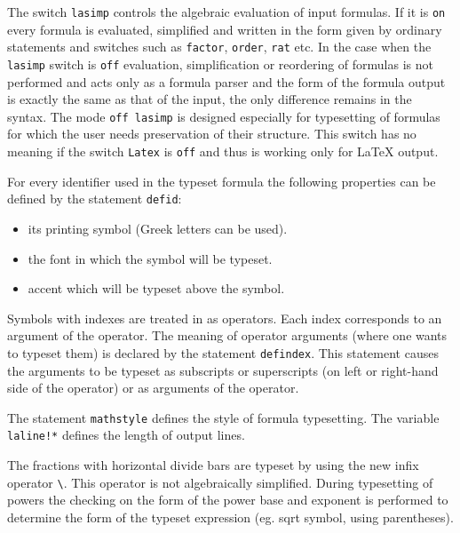 The switch {\tt lasimp} controls the algebraic evaluation of input
formulas.  If it is {\tt on} every formula is evaluated, simplified and
written in the form given by ordinary \REDUCE{} statements and switches
such as {\tt factor}, {\tt order}, {\tt rat} etc.  In the case when the
{\tt lasimp} switch is {\tt off} evaluation, simplification or
reordering of formulas is not performed and \REDUCE{} acts only as a
formula parser and the form of the formula output is exactly the same as
that of the input, the only difference remains in the syntax.  The mode
{\tt off lasimp} is designed especially for typesetting of formulas for
which the user needs preservation of their structure.  This switch has
no meaning if the switch {\tt Latex} is {\tt off} and thus is working
only for \LaTeX{} output.

For every  identifier  used  in  the  typeset  \REDUCE{}  formula
the following properties can be defined by the statement {\tt defid}:
\begin{itemize}
\item its printing symbol (Greek letters can be used).
\item the font in which the symbol will be typeset.
\item accent which will be typeset above the symbol.
\end{itemize}

Symbols with indexes are treated in \REDUCE{} as operators.  Each index
corresponds to an argument of the operator.  The meaning of operator
arguments (where one wants to typeset them) is declared by the statement
{\tt defindex}.  This statement causes the arguments to be typeset as
subscripts or superscripts (on left or right-hand side of the operator)
or as arguments of the operator.

The statement {\tt mathstyle} defines the style of formula typesetting.
The variable {\tt laline!*} defines the length of output lines.

The fractions with horizontal divide bars are typeset by using the
new \REDUCE{} infix operator \verb+\+.  This operator is not
algebraically simplified.  During typesetting of powers the checking on
the form of the power base and exponent is performed to determine the
form of the typeset expression (eg.  sqrt symbol, using parentheses).

